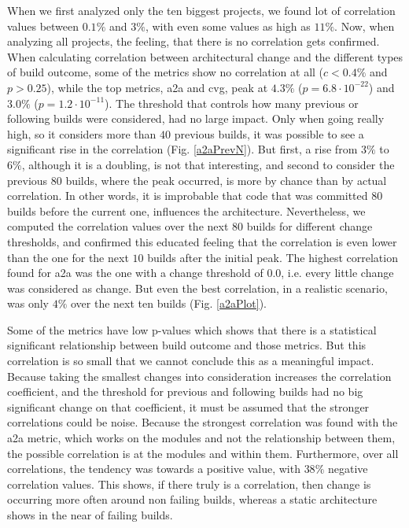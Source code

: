 \documentclass[sigplan, anonymous, review]{acmart}
\begin{document}
When we first analyzed only the ten biggest projects, we found lot of correlation values between $0.1\%$ and $3\%$, with even some values as high as $11\%$. Now, when analyzing all projects, the feeling, that there is no correlation gets confirmed. When calculating correlation between architectural change and the different types of build outcome, some of the metrics show no correlation at all ($c < 0.4\%$ and $p > 0.25$), while the top metrics, a2a and cvg, peak at $4.3\%$ ($p = 6.8 \cdot 10^{-22}$) and $3.0\%$ ($p=1.2 \cdot 10^{-11}$). 
The threshold that controls how many previous or following builds were considered, had no large impact. Only when going really high, so it considers more than $40$ previous builds, it was possible to see a significant rise in the correlation (Fig. \ref{a2aPrevN}). But first, a rise from $3\%$ to $6\%$, although it is a doubling, is not that interesting, and second to consider the previous $80$ builds, where the peak occurred, is more by chance than by actual correlation. In other words, it is improbable that code that was committed $80$ builds before the current one, influences the architecture. 
Nevertheless, we computed the correlation values over the next $80$ builds for different change thresholds, and confirmed this educated feeling that the correlation is even lower than the one for the next $10$ builds after the initial peak.
The highest correlation found for a2a was the one with a change threshold of $0.0$, i.e. every little change was considered as change. But even the best correlation, in a realistic scenario, was only $4\%$ over the next ten builds (Fig. \ref{a2aPlot}). 

Some of the metrics have low p-values which shows that there is a statistical significant relationship between build outcome and those metrics. But this correlation is so small that we cannot conclude this as a meaningful impact. Because taking the smallest changes into consideration increases the correlation coefficient, and the threshold for previous and following builds had no big significant change on that coefficient, it must be assumed that the stronger correlations could be noise. Because the strongest correlation was found with the a2a metric, which works on the modules and not the relationship between them, the possible correlation is at the modules and within them. Furthermore, over all correlations, the tendency was towards a positive value, with $38\%$ negative correlation values. This shows, if there truly is a correlation, then change is occurring more often around non failing builds, whereas a static architecture shows in the near of failing builds. 
\end{document}
